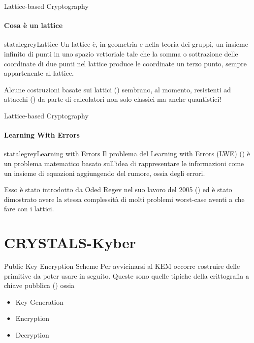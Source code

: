 \begin{frame}{Lattice-based Cryptography}
    \framesubtitle{Cosa è un lattice}

    \begin{colorblock}[black]{statalegrey}{Lattice}
Un lattice è, in geometria e nella teoria dei gruppi, un insieme infinito di punti in uno spazio vettoriale tale che la somma o sottrazione delle coordinate di due punti nel lattice produce le coordinate un terzo punto, sempre appartenente al lattice.
    \end{colorblock}

    Alcune costruzioni basate sui lattici (\cite{svp}) sembrano, al momento, resistenti ad attacchi (\cite{regev}) da parte di calcolatori non solo classici ma anche quantistici!

\end{frame}
\begin{frame}{Lattice-based Cryptography}
\framesubtitle{Learning With Errors}

    \begin{colorblock}[black]{statalegrey}{Learning with Errors}
        Il problema del Learning with Errors (LWE) (\cite{svp}) è un problema matematico basato sull'idea di rappresentare le informazioni come un insieme di equazioni aggiungendo del rumore, ossia degli errori.
    \end{colorblock}
    Esso è stato introdotto da Oded Regev nel suo lavoro del 2005 (\cite{regev}) ed è stato dimostrato avere la stessa complessità di molti problemi worst-case aventi a che fare con i lattici.
\end{frame}

\section{CRYSTALS-Kyber}

\begin{frame}{Public Key Encryption Scheme}
    Per avvicinarsi al KEM occorre costruire delle primitive da poter usare in seguito. Queste sono quelle tipiche della crittografia a chiave pubblica (\cite{kyber17}) ossia\begin{itemize}
    \item Key Generation
    \item Encryption
    \item Decryption
\end{itemize}
\end{frame}

